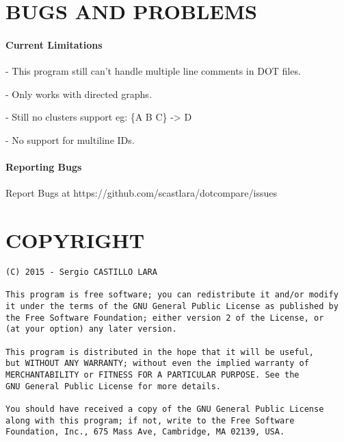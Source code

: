 \documentclass[10pt]{article}
\begin{document}
\section{BUGS AND PROBLEMS}\label{bugs-and-problems}

\paragraph{Current Limitations}\label{current-limitations}

- This program still can't handle multiple line comments in DOT files.

- Only works with directed graphs.

- Still no clusters support eg: \{A B C\} -\textgreater{} D

- No support for multiline IDs.

\paragraph{Reporting Bugs}\label{reporting-bugs}

Report Bugs at https://github.com/scastlara/dotcompare/issues

\section{COPYRIGHT}\label{copyright}

\begin{verbatim}
(C) 2015 - Sergio CASTILLO LARA

This program is free software; you can redistribute it and/or modify
it under the terms of the GNU General Public License as published by
the Free Software Foundation; either version 2 of the License, or
(at your option) any later version.

This program is distributed in the hope that it will be useful,
but WITHOUT ANY WARRANTY; without even the implied warranty of
MERCHANTABILITY or FITNESS FOR A PARTICULAR PURPOSE. See the
GNU General Public License for more details.

You should have received a copy of the GNU General Public License
along with this program; if not, write to the Free Software
Foundation, Inc., 675 Mass Ave, Cambridge, MA 02139, USA.
\end{verbatim}
\end{document}
